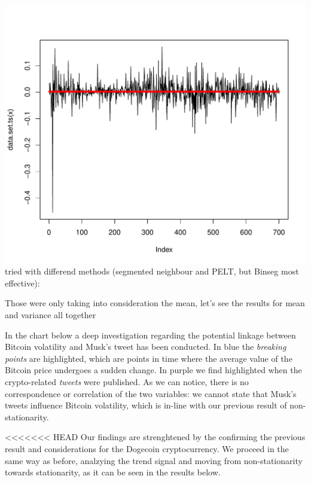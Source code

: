 \documentclass[
]{article}
\begin{document}
\includegraphics{Trial1_files/figure-latex/fig17-1.pdf} tried with
differend methods (segmented neighbour and PELT, but Binseg most
effective):

Those were only taking into consideration the mean, let's see the
results for mean and variance all together

In the chart below a deep investigation regarding the potential linkage
between Bitcoin volatility and Musk's tweet has been conducted. In blue
the \emph{breaking points} are highlighted, which are points in time
where the average value of the Bitcoin price undergoes a sudden change.
In purple we find highlighted when the crypto-related \emph{tweets} were
published. As we can notice, there is no correspondence or correlation
of the two variables: we cannot state that Musk's tweets influence
Bitcoin volatility, which is in-line with our previous result of
non-stationarity.

\textless\textless\textless\textless\textless\textless\textless{} HEAD
Our findings are strenghtened by the confirming the previous result and
considerations for the Dogecoin cryptocurrency. We proceed in the same
way as before, analzying the trend signal and moving from
non-stationarity towards stationarity, as it can be seen in the results
below.
\end{document}
